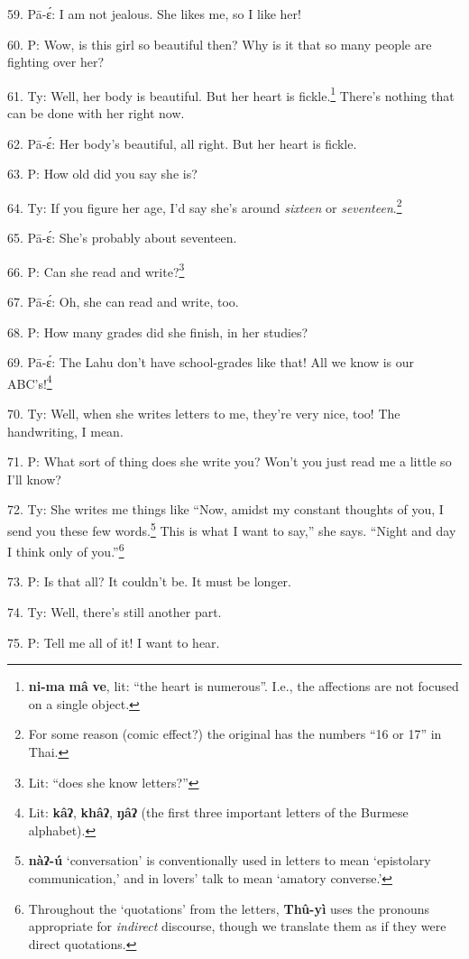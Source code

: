 59. Pā-ɛ́: I am not jealous. She likes me, so I like her!

60. P: Wow, is this girl so beautiful then? Why is it that so many people
are fighting over her?

61. Ty: Well, her body is beautiful. But her heart is fickle.\footnote{\textbf{ni-ma} \textbf{mâ} \textbf{ve}, lit: ``the heart is numerous''. I.e., the affections are not focused on a single object.} There's
nothing that can be done with her right now.

62. Pā-ɛ́: Her body's beautiful, all right. But her heart is fickle.

63. P: How old did you say she is?

64. Ty: If you figure her age, I'd say she's around \textit{sixteen} or \textit{seventeen}.\footnote{For some reason (comic effect?) the original has the numbers ``16 or 17'' in Thai.}

65. Pā-ɛ́: She's probably about seventeen.

66. P: Can she read and write?\footnote{Lit: ``does she know letters?''}

67. Pā-ɛ́: Oh, she can read and write, too.

68. P: How many grades did she finish, in her studies?

69. Pā-ɛ́: The Lahu don't have school-grades like that! All we know is our ABC's!\footnote{Lit: \textbf{kâʔ}, \textbf{khâʔ}, \textbf{ŋâʔ} (the first three important letters of the Burmese alphabet).}

70. Ty: Well, when she writes letters to me, they're very nice, too! The handwriting,
I mean.

71. P: What sort of thing does she write you? Won't you just read me a little
so I'll know?

72. Ty: She writes me things like ``Now, amidst my constant thoughts
of you, I send you these few words.\footnote{\textbf{nàʔ-ú} `conversation' is conventionally used in letters to mean `epistolary communication,' and in lovers' talk to mean `amatory converse.'} This is what I want to say,'' she says.
``Night and day I think only of you.''\footnote{Throughout the `quotations' from the letters, \textbf{Thû-yì} uses the pronouns appropriate for\textit{ indirect }discourse, though we translate them as if they were direct quotations.}

73. P: Is that all? It couldn't be. It must be longer.

74. Ty: Well, there's still another part.

75. P: Tell me all of it! I want to hear.

